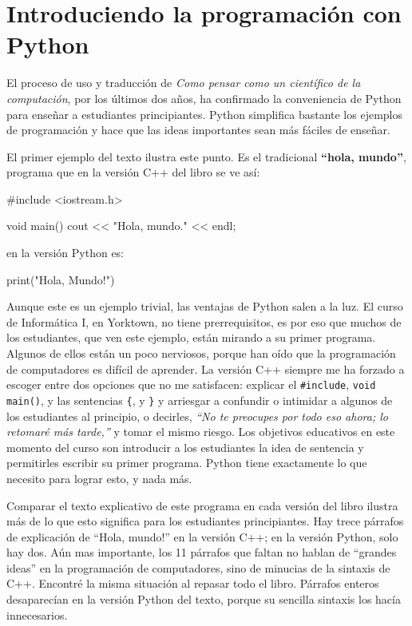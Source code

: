 \section*{Introduciendo la programación con Python}

El proceso de uso y traducción de {\em Como pensar como un científico de la 
computación}, por los últimos dos años, ha confirmado la conveniencia de Python 
para enseñar a estudiantes principiantes.  Python simplifica bastante los 
ejemplos de programación y hace que las ideas importantes sean más fáciles de 
enseñar.

El primer ejemplo del texto ilustra este punto. Es el tradicional 
\textbf{``hola, mundo''}, programa que en la versión C++ del libro se ve así:

\begin{ccode}
#include <iostream.h>

void main()
{
 cout << "Hola, mundo." << endl;
}
\end{ccode}

en la versión Python es:

\begin{pythoncode}
print("Hola, Mundo!")
\end{pythoncode}

Aunque este es un ejemplo trivial, las ventajas de Python salen a la luz.  
El curso de Informática I, en Yorktown, no tiene prerrequisitos, es por eso que 
muchos de los estudiantes, que ven este ejemplo, están mirando a su primer 
programa.  Algunos de ellos están un poco nerviosos, porque han oído que la 
programación de computadores es difícil de aprender.  La versión C++ siempre me 
ha forzado a escoger entre dos opciones que no me satisfacen: explicar el 
\texttt{\#include}, \texttt{void main()}, y las sentencias \texttt{\{}, y 
\texttt{\}} y arriesgar a confundir o intimidar a algunos de los estudiantes al 
principio, o decirles, \textit{``No te preocupes por todo eso ahora;  lo 
retomaré más tarde,''} y tomar el mismo riesgo.  Los objetivos educativos en 
este momento del curso son  introducir a los estudiantes  la idea de  sentencia 
y  permitirles escribir su primer programa. Python tiene exactamente lo 
que necesito para lograr esto, y nada más.

Comparar el texto explicativo de este programa en cada versión del libro
ilustra más de lo que esto significa para los estudiantes principiantes.  Hay 
trece párrafos de explicación de ``Hola, mundo!'' en la versión C++;  en la 
versión Python, solo hay dos.  Aún mas importante,  los 11 párrafos que faltan 
no hablan de ``grandes ideas'' en la programación de computadores, sino de 
minucias de la sintaxis de C++.  
Encontré la misma situación al repasar todo el libro.  Párrafos enteros
desaparecían en la versión Python del texto, porque su sencilla sintaxis los hacía innecesarios.

